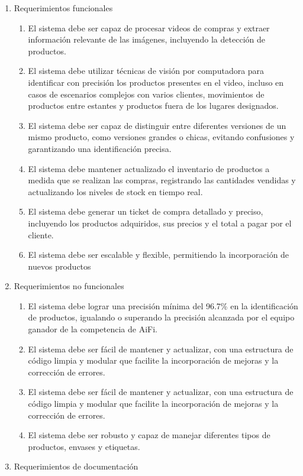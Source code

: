 \documentclass[
11pt, %
codirector, %
]{charter}
\begin{document}
\begin{enumerate}
	\item Requerimientos funcionales
		\begin{enumerate}
			\item El sistema debe ser capaz de procesar videos de compras y extraer información relevante de las imágenes, incluyendo la detección de productos.
			\item El sistema debe utilizar técnicas de visión por computadora para identificar con precisión los productos presentes en el video, incluso en casos de escenarios complejos con varios clientes, movimientos de productos entre estantes y productos fuera de los lugares designados.
			\item El sistema debe ser capaz de distinguir entre diferentes versiones de un mismo producto, como versiones grandes o chicas, evitando confusiones y garantizando una identificación precisa.
			\item El sistema debe mantener actualizado el inventario de productos a medida que se realizan las compras, registrando las cantidades vendidas y actualizando los niveles de stock en tiempo real.
			\item El sistema debe generar un ticket de compra detallado y preciso, incluyendo los productos adquiridos, sus precios y el total a pagar por el cliente.
			\item El sistema debe ser escalable y flexible, permitiendo la incorporación de nuevos productos
		\end{enumerate}
	\item Requerimientos no funcionales
		\begin{enumerate}
			\item El sistema debe lograr una precisión mínima del 96.7\% en la identificación de productos, igualando o superando la precisión alcanzada por el equipo ganador de la competencia de AiFi.
			\item El sistema debe ser fácil de mantener y actualizar, con una estructura de código limpia y modular que facilite la incorporación de mejoras y la corrección de errores.
			\item El sistema debe ser fácil de mantener y actualizar, con una estructura de código limpia y modular que facilite la incorporación de mejoras y la corrección de errores.
			\item El sistema debe ser robusto y capaz de manejar diferentes tipos de productos, envases y etiquetas.
		\end{enumerate}
		\item Requerimientos de documentación

\end{enumerate}
\end{document}
